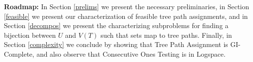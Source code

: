 \documentclass{llncs}
\def\cF{{\cal F}}
\def\cH{{\cal H}}
\def\F{{\mathcal F}}
\begin{document}
\noindent
{\bf Roadmap:} In Section \ref{prelims} we present the necessary preliminaries, in Section \ref{feasible} we present our characterization of feasible tree path assignments, and in Section \ref{decompos} we present the characterizing subproblems for finding a bijection between $U$ and $V(T)$ such that sets map to tree paths. Finally, in Section \ref{complexity} we conclude by showing that Tree Path Assignment is GI-Complete, and also observe that Consecutive Ones Testing is in Logspace.  





\end{document}
